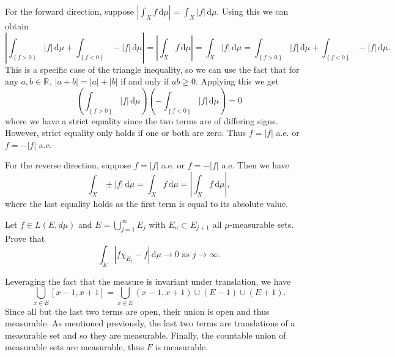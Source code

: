 \begin{solution}
  For the forward direction, suppose $\left| \int_{X} \! f \, \mathrm{d}\mu  \right| = \int_{X} \! \left| f \right| \, \mathrm{d}\mu $.
  Using this we can obtain
  \[
  \left| \int_{\left\{ f > 0 \right\}} \! \left| f \right| \, \mathrm{d} \mu + \int_{\left\{ f < 0 \right\}} \! - \left| f \right| \, \mathrm{d} \mu  \right| = \left| \int_{X} \! f \, \mathrm{d} \mu  \right| = \int_{X} \! \left| f \right| \, \mathrm{d} \mu =  \int_{\left\{ f > 0 \right\}} \! \left| f \right| \, \mathrm{d} \mu + \int_{\left\{ f < 0 \right\}} \! - \left| f \right| \, \mathrm{d} \mu
  .\] 
  This is a specific case of the triangle inequality, so we can use the fact that for any $a,b \in \mathbb{R}^{}$, $\left| a + b \right| = \left| a \right| + \left| b \right|$ if and only if $ab \geq 0$.
  Applying this we get
  \[
  \left( \int_{\left\{ f > 0 \right\}} \! \left| f \right| \, \mathrm{d} \mu  \right) \left( - \int_{\left\{ f < 0 \right\}} \! \left| f \right| \, \mathrm{d} \mu \right) = 0
  \] 
  where we have a strict equality since the two terms are of differing signs.
  However, strict equality only holds if one or both are zero.
  Thus $f = \left| f \right|$ a.e. or $f = - \left| f \right|$ a.e.

  For the reverse direction, suppose $f = \left| f \right|$ a.e. or $f = - \left| f \right|$ a.e.
  Then we have
  \[
  \int_{X} \! \pm \left| f \right| \, \mathrm{d} \mu = \int_{X} \! f \, \mathrm{d} \mu = \left| \int_{X} \! f \, \mathrm{d} \mu  \right|
  ,\]
  where the last equality holds as the first term is equal to its absolute value.
\end{solution}

\pagebreak

\begin{problem}{4}
  Let $f \in L\left( E, d \mu \right)$ and $E = \bigcup_{j=1}^{\infty} E_{j} $ with $E_{n} \subset E_{j+1}$ all $\mu$-measurable sets.
  Prove that
  \[
  \int_{E} \! \left| f \chi_{E_{j}} - f \right| \, \mathrm{d} \mu \to 0 \text{ as } j \to \infty
  .\] 
\end{problem}

\begin{solution}
  Leveraging the fact that the measure is invariant under translation, we have
  \[
    \bigcup_{x \in E}[x-1,x+1] = \bigcup_{x \in E} (x-1,x+1) \cup (E - 1) \cup (E+1)
  .\] 
  Since all but the last two terms are open, their union is open and thus measurable.
  As mentioned previously, the last two terms are translations of a measurable set and so they are measurable.
  Finally, the countable union of measurable sets are measurable, thus $F$ is measurable.
\end{solution}

